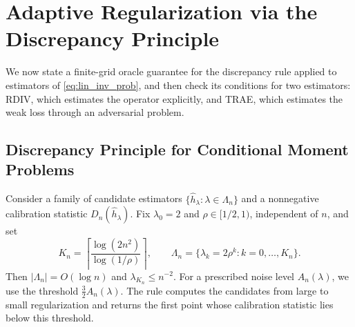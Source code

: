 \documentclass[12pt]{article}
\theoremstyle{plain}
\theoremstyle{definition}
\theoremstyle{remark}
\begin{document}
 
\section{Adaptive Regularization via the Discrepancy Principle} \label{sec:dp_regularization}

We now state a finite-grid oracle guarantee for the discrepancy rule applied to estimators of \eqref{eq:lin_inv_prob}, and then check its conditions for two estimators: RDIV, which estimates the operator explicitly, and TRAE, which estimates the weak loss through an adversarial problem.

\subsection{Discrepancy Principle for Conditional Moment Problems}

Consider a family of candidate estimators $\{\hat h_\lambda:\lambda\in\Lambda_n\}$ and a nonnegative calibration statistic $D_n(\hat h_\lambda)$. Fix $\lambda_0=2$ and $\rho\in[1/2,1)$, independent of $n$, and set
\[
K_n=\left\lceil\frac{\log(2n^2)}{\log(1/\rho)}\right\rceil,
\qquad
\Lambda_n=\{\lambda_k=2\rho^k:k=0,\ldots,K_n\}.
\]
Then $|\Lambda_n|=O(\log n)$ and $\lambda_{K_n}\leqslant n^{-2}$. For a prescribed noise level $A_n(\lambda)$, we use the threshold $\tfrac32A_n(\lambda)$. The rule computes the candidates from large to small regularization and returns the first point whose calibration statistic lies below this threshold.
\end{document}
